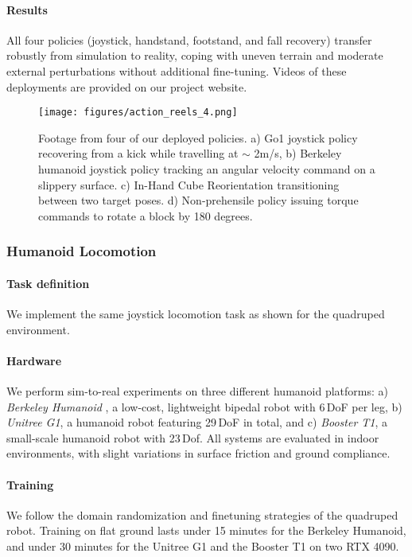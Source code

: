 \paragraph{Results} All four policies (joystick, handstand, footstand, and fall recovery) transfer robustly from simulation to reality, coping with uneven terrain and moderate external perturbations without additional fine-tuning. Videos of these deployments are provided on our project website.

\begin{figure*}[t]
    \centering
    \texttt{[image: figures/action\_reels\_4.png]}
    \caption{\small Footage from four of our deployed policies. a) Go1 joystick policy recovering from a kick while travelling at $\sim$ 2m/s, b) Berkeley humanoid joystick policy tracking an angular velocity command on a slippery surface. c) In-Hand Cube Reorientation transitioning between two target poses. d) Non-prehensile policy issuing torque commands to rotate a block by 180 degrees.}
    \label{fig:action_reel}
\end{figure*}

\subsubsection{Humanoid Locomotion}

\paragraph{Task definition} We implement the same joystick locomotion task as shown for the quadruped environment.

\paragraph{Hardware} We perform sim-to-real experiments on three different humanoid platforms: a) \textit{Berkeley Humanoid} \cite{liao2024berkeley}, a low-cost, lightweight bipedal robot with 6\,DoF per leg, b) \textit{Unitree G1}, a humanoid robot featuring 29\,DoF in total, and c) \textit{Booster T1}, a small-scale humanoid robot with 23\,Dof. All systems are evaluated in indoor environments, with slight variations in surface friction and ground compliance.

\paragraph{Training} We follow the domain randomization and finetuning strategies of the quadruped robot. Training on flat ground lasts under 15 minutes for the Berkeley Humanoid, and under 30 minutes for the Unitree G1 and the Booster T1 on two RTX 4090.


